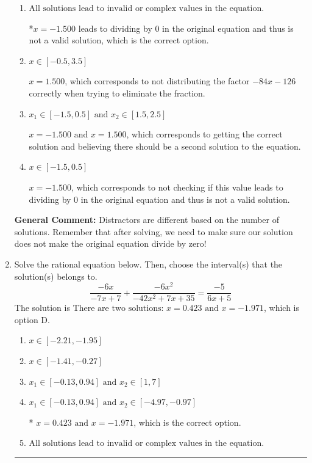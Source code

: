 \documentclass{extbook}[14pt]
\newcommand{\litem}[1]{\item #1

\rule{\textwidth}{0.4pt}}
\begin{document}
\begin{enumerate}
{\begin{enumerate}[label=\Alph*.]
$x = -1.500 \text{ and } x = -1.500$, which corresponds to getting the correct solution and believing there should be a second solution to the equation.
\item \( \text{All solutions lead to invalid or complex values in the equation.} \)

*$x = -1.500$ leads to dividing by 0 in the original equation and thus is not a valid solution, which is the correct option.
\item \( x \in [-0.5,3.5] \)

$x = 1.500$, which corresponds to not distributing the factor $-84x -126$ correctly when trying to eliminate the fraction.
\item \( x_1 \in [-1.5, 0.5] \text{ and } x_2 \in [1.5,2.5] \)

$x = -1.500 \text{ and } x = 1.500$, which corresponds to getting the correct solution and believing there should be a second solution to the equation.
\item \( x \in [-1.5,0.5] \)

$x = -1.500$, which corresponds to not checking if this value leads to dividing by 0 in the original equation and thus is not a valid solution.
\end{enumerate}

\textbf{General Comment:} Distractors are different based on the number of solutions. Remember that after solving, we need to make sure our solution does not make the original equation divide by zero!
}
\litem{
Solve the rational equation below. Then, choose the interval(s) that the solution(s) belongs to.
\[ \frac{-6x}{-7x + 7} + \frac{-6x^{2}}{-42x^{2} +7 x + 35} = \frac{-5}{6x + 5} \]The solution is \( \text{There are two solutions: } x = 0.423 \text{ and } x = -1.971 \), which is option D.\begin{enumerate}[label=\Alph*.]
\item \( x \in [-2.21,-1.95] \)


\item \( x \in [-1.41,-0.27] \)


\item \( x_1 \in [-0.13, 0.94] \text{ and } x_2 \in [1,7] \)


\item \( x_1 \in [-0.13, 0.94] \text{ and } x_2 \in [-4.97,-0.97] \)

* $x = 0.423 \text{ and } x = -1.971$, which is the correct option.
\item \( \text{All solutions lead to invalid or complex values in the equation.} \)



\end{enumerate}}
\end{enumerate}
\end{document}
